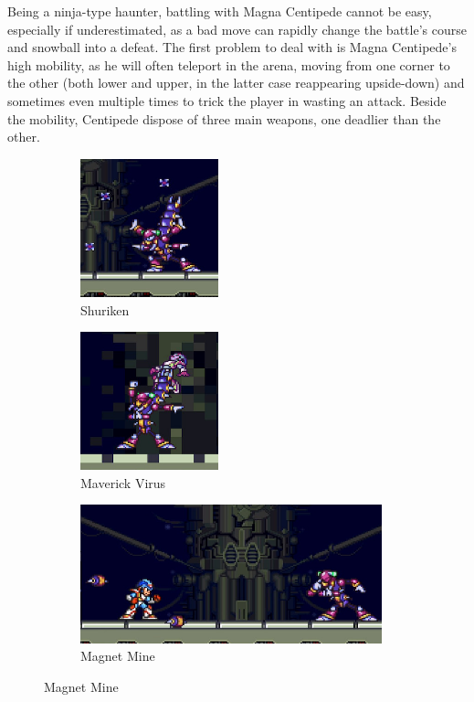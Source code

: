 Being a ninja-type haunter, battling with Magna Centipede cannot be easy, especially if underestimated, as a bad move can rapidly change the battle's course and snowball into a defeat. The first problem to deal with is Magna Centipede's high mobility, as he will often teleport in the arena, moving from one corner to the other (both lower and upper, in the latter case reappearing upside-down) and sometimes even multiple times to trick the player in wasting an attack. Beside the mobility, Centipede dispose of three main weapons, one deadlier than the other.
\begin{figure}[htp]
	\centering
	\begin{subfigure}{0.4\linewidth}
		\centering
		\includegraphics[height=4cm]{figures/X2/Magna_centipede/Centipede_shuriken.png}
		\caption{Shuriken}
	\end{subfigure}
	\begin{subfigure}{0.4\linewidth}
		\centering
		\includegraphics[height=4cm]{figures/X2/Magna_centipede/Centipede_injection.png}
		\caption{Maverick Virus}
	\end{subfigure}
	\begin{subfigure}{\linewidth}
		\centering
		\includegraphics[height= 4cm]{figures/X2/Magna_centipede/Centipede_magnet.png}
		\caption{Magnet Mine}
	\end{subfigure}

\end{figure}
